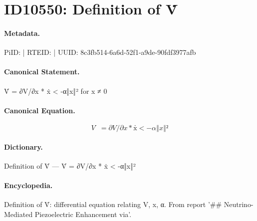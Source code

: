 \section*{ID10550: Definition of V̇}
\paragraph{Metadata.}
PiID:  | RTEID:  | UUID: 8c3fb514-6a6d-52f1-a9de-90fdf3977afb

\paragraph{Canonical Statement.}
V̇ = ∂V/∂x * ẋ < -α‖x‖² for x ≠ 0

\paragraph{Canonical Equation.}
\[
V̇ = ∂V/∂x * ẋ < -α‖x‖²
\]

\paragraph{Dictionary.}
Definition of V̇ — V̇ = ∂V/∂x * ẋ < -α‖x‖²

\paragraph{Encyclopedia.}
Definition of V̇: differential equation relating V, x, α. From report '\#\# Neutrino-Mediated Piezoelectric Enhancement via'.
